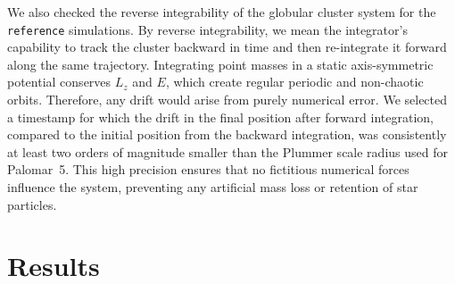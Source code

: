         We also checked the reverse integrability of the globular cluster system for the \texttt{reference} simulations. By reverse integrability, we mean the integrator's capability to track the cluster backward in time and then re-integrate it forward along the same trajectory. Integrating point masses in a static axis-symmetric potential conserves $L_z$ and $E$, which create regular periodic and non-chaotic orbits. Therefore, any drift would arise from purely numerical error. We selected a timestamp for which the drift in the final position after forward integration, compared to the initial position from the backward integration, was consistently at least two orders of magnitude smaller than the Plummer scale radius used for Palomar~5. This high precision ensures that no fictitious numerical forces influence the system, preventing any artificial mass loss or retention of star particles.



\section{Results}

